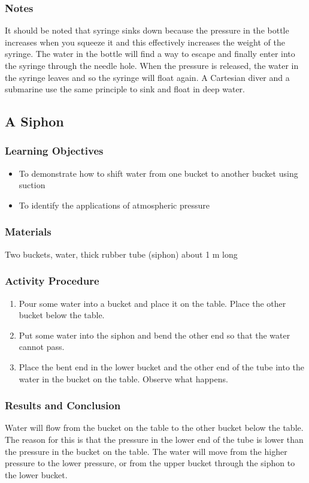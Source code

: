 \subsubsection*{Notes}
It should be noted that syringe sinks down because the pressure in the bottle increases when you squeeze it and this effectively increases the weight of the syringe. The water in the bottle will find a way to escape and finally enter into the syringe through the needle hole. When the pressure is released, the water in the syringe leaves and so the syringe will float again. A Cartesian diver and a submarine use the same principle to sink and float in deep water.


\subsection{A Siphon}

\subsubsection*{Learning Objectives}
\begin{itemize}
\item{To demonstrate how to shift water from one bucket to another bucket using suction} 
\item{To identify the applications of atmospheric pressure} 
\end{itemize}

\subsubsection*{Materials}
Two buckets, water, thick rubber tube (siphon) about 1 m long

\subsubsection*{Activity Procedure}
\begin{enumerate}
\item{Pour some water into a bucket and place it on the table. Place the other bucket below the table.} 
\item{Put some water into the siphon and bend the other end so that the water cannot pass.} 
\item{Place the bent end in the lower bucket and the other end of the tube into the water in the bucket on the table. Observe what happens.} 
\end{enumerate}

\subsubsection*{Results and Conclusion}
Water will flow from the bucket on the table to the other bucket below the table. The reason for this is that the pressure in the lower end of the tube is lower than the pressure in the bucket on the table. The water will move from the higher pressure to the lower pressure, or from the upper bucket through the siphon to the lower bucket. 

